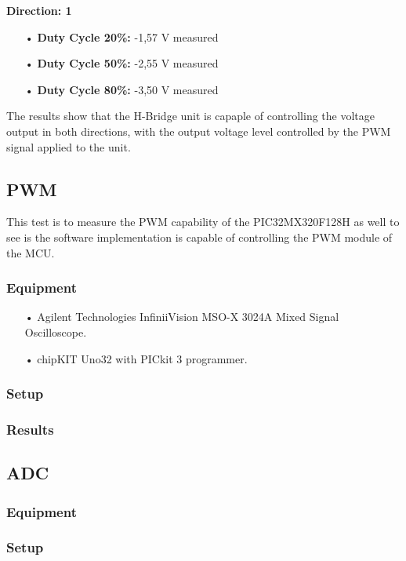 \textbf{Direction: 1}
\begin{enumerate}
	\item[•]\textbf{Duty Cycle 20\%:} -1,57 V measured
	\item[•]\textbf{Duty Cycle 50\%:} -2,55 V measured
	\item[•]\textbf{Duty Cycle 80\%:} -3,50 V measured
\end{enumerate}

The results show that the H-Bridge unit is capaple of controlling the voltage output in both directions, with the output voltage level controlled by the PWM signal applied to the unit.


\subsection{PWM}
This test is to measure the PWM capability of the PIC32MX320F128H as well to see is the software implementation is capable of controlling the PWM module of the MCU.

\subsubsection{Equipment}
\begin{enumerate}
	\item[•]Agilent Technologies InfiniiVision MSO-X 3024A Mixed Signal Oscilloscope.
	\item[•]chipKIT Uno32 with PICkit 3 programmer.
\end{enumerate}

\subsubsection{Setup}

\subsubsection{Results}

\subsection{ADC}

\subsubsection{Equipment}

\subsubsection{Setup}

